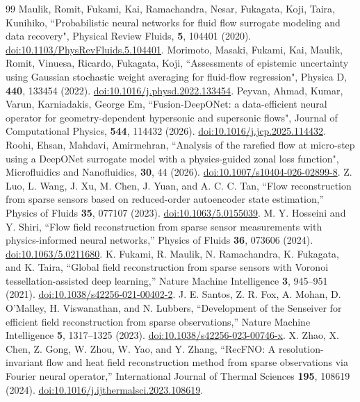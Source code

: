 \documentclass[aip,pof,preprint,floatfix,amsmath,amssymb]{revtex4-2}
\begin{document}
\begin{thebibliography}{99}
 Maulik, Romit, Fukami, Kai, Ramachandra, Nesar, Fukagata, Koji, Taira, Kunihiko, ``Probabilistic neural networks for fluid flow surrogate modeling and data recovery", Physical Review Fluids, \textbf{5}, 104401 (2020). \href{https://doi.org/10.1103/PhysRevFluids.5.104401}{doi:10.1103/PhysRevFluids.5.104401}.
 Morimoto, Masaki, Fukami, Kai, Maulik, Romit, Vinuesa, Ricardo, Fukagata, Koji, ``Assessments of epistemic uncertainty using Gaussian stochastic weight averaging for fluid-flow regression", Physica D, \textbf{440}, 133454 (2022). \href{https://doi.org/10.1016/j.physd.2022.133454}{doi:10.1016/j.physd.2022.133454}.
 Peyvan, Ahmad, Kumar, Varun, Karniadakis, George Em, ``Fusion-DeepONet: a data-efficient neural operator for geometry-dependent hypersonic and supersonic flows", Journal of Computational Physics, \textbf{544}, 114432 (2026). \href{https://doi.org/10.1016/j.jcp.2025.114432}{doi:10.1016/j.jcp.2025.114432}.
 Roohi, Ehsan, Mahdavi, Amirmehran, ``Analysis of the rarefied flow at micro-step using a DeepONet surrogate model with a physics-guided zonal loss function", Microfluidics and Nanofluidics, \textbf{30}, 44 (2026). \href{https://doi.org/10.1007/s10404-026-02899-8}{doi:10.1007/s10404-026-02899-8}.
 Z. Luo, L. Wang, J. Xu, M. Chen, J. Yuan, and A. C. C. Tan, ``Flow reconstruction from sparse sensors based on reduced-order autoencoder state estimation,'' Physics of Fluids \textbf{35}, 077107 (2023). \href{https://doi.org/10.1063/5.0155039}{doi:10.1063/5.0155039}.
 M. Y. Hosseini and Y. Shiri, ``Flow field reconstruction from sparse sensor measurements with physics-informed neural networks,'' Physics of Fluids \textbf{36}, 073606 (2024). \href{https://doi.org/10.1063/5.0211680}{doi:10.1063/5.0211680}.
 K. Fukami, R. Maulik, N. Ramachandra, K. Fukagata, and K. Taira, ``Global field reconstruction from sparse sensors with Voronoi tessellation-assisted deep learning,'' Nature Machine Intelligence \textbf{3}, 945--951 (2021). \href{https://doi.org/10.1038/s42256-021-00402-2}{doi:10.1038/s42256-021-00402-2}.
 J. E. Santos, Z. R. Fox, A. Mohan, D. O'Malley, H. Viswanathan, and N. Lubbers, ``Development of the Senseiver for efficient field reconstruction from sparse observations,'' Nature Machine Intelligence \textbf{5}, 1317--1325 (2023). \href{https://doi.org/10.1038/s42256-023-00746-x}{doi:10.1038/s42256-023-00746-x}.
 X. Zhao, X. Chen, Z. Gong, W. Zhou, W. Yao, and Y. Zhang, ``RecFNO: A resolution-invariant flow and heat field reconstruction method from sparse observations via Fourier neural operator,'' International Journal of Thermal Sciences \textbf{195}, 108619 (2024). \href{https://doi.org/10.1016/j.ijthermalsci.2023.108619}{doi:10.1016/j.ijthermalsci.2023.108619}.

\end{thebibliography}
\end{document}
